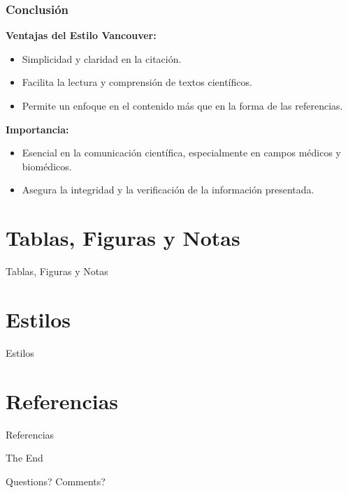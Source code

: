 \documentclass[
11pt, %
]{beamer}
\begin{document}
\begin{frame}
	\frametitle{Conclusión}

	\textbf{Ventajas del Estilo Vancouver:}
	\begin{itemize}
		\item Simplicidad y claridad en la citación.
		\item Facilita la lectura y comprensión de textos científicos.
		\item Permite un enfoque en el contenido más que en la forma de las referencias.
	\end{itemize}

	\textbf{Importancia:}
	\begin{itemize}
		\item Esencial en la comunicación científica, especialmente en campos médicos y biomédicos.
		\item Asegura la integridad y la verificación de la información presentada.
	\end{itemize}

\end{frame}


\section{Tablas, Figuras y Notas}
\begin{frame}{Tablas, Figuras y Notas}

\end{frame}

\section{Estilos}
\begin{frame}{Estilos}

\end{frame}

\section{Referencias}
\begin{frame}{Referencias}

\end{frame}


\begin{frame}[plain] %
	\begin{center}
		{\Huge The End}

		\bigskip\bigskip %

		{\LARGE Questions? Comments?}
	\end{center}
\end{frame}

\end{document}
